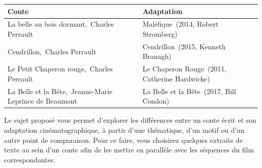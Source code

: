 \documentclass[
  10pt,
  french,
  a5paper,
  openany]{book}
\begin{document}
\begin{longtable}[]{@{}ll@{}}
\toprule
\begin{minipage}[b]{0.51\columnwidth}\raggedright
Conte\strut
\end{minipage} & \begin{minipage}[b]{0.43\columnwidth}\raggedright
Adaptation\strut
\end{minipage}\tabularnewline
\midrule
\endhead
\begin{minipage}[t]{0.51\columnwidth}\raggedright
La belle au bois dormant,\linebreak~Charles Perrault\strut
\end{minipage} & \begin{minipage}[t]{0.43\columnwidth}\raggedright
Maléfique\linebreak~(2014, Robert Stromberg)\strut
\end{minipage}\tabularnewline
\begin{minipage}[t]{0.51\columnwidth}\raggedright
Cendrillon,\linebreak~Charles Perrault\strut
\end{minipage} & \begin{minipage}[t]{0.43\columnwidth}\raggedright
Cendrillon\linebreak~(2015, Kenneth Branagh)\strut
\end{minipage}\tabularnewline
\begin{minipage}[t]{0.51\columnwidth}\raggedright
Le Petit Chaperon rouge,\linebreak~Charles Perrault\strut
\end{minipage} & \begin{minipage}[t]{0.43\columnwidth}\raggedright
Le Chaperon Rouge\linebreak~(2011, Catherine Hardwicke)\strut
\end{minipage}\tabularnewline
\begin{minipage}[t]{0.51\columnwidth}\raggedright
La Belle et la Bête,\linebreak~Jeanne-Marie Leprince de Beaumont\strut
\end{minipage} & \begin{minipage}[t]{0.43\columnwidth}\raggedright
La Belle et la Bête\linebreak~(2017, Bill Condon)\strut
\end{minipage}\tabularnewline
\bottomrule
\end{longtable}

\clearpage

Le sujet proposé vous permet d'explorer les différences entre un conte écrit et son adaptation cinématographique, à partir d'une thématique, d'un motif ou d'un autre point de comparaison. Pour ce faire, vous choisirez quelques extraits de texte au sein d'un conte afin de les mettre en parallèle avec les séquences du film correspondantes.
\end{document}

